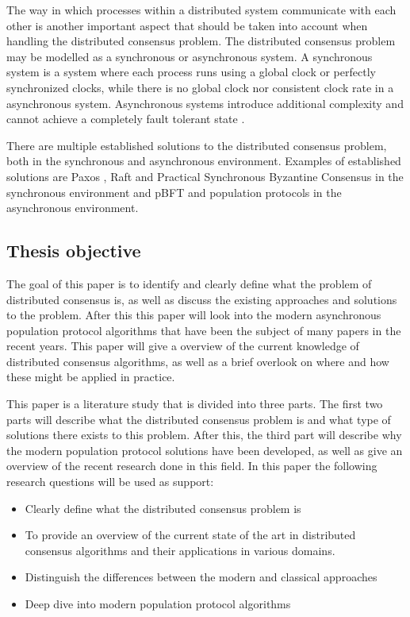 The way in which processes within a distributed system communicate with each other is another important aspect that should be taken into account when handling the distributed consensus problem. The distributed consensus problem may be modelled as a synchronous or asynchronous system. A synchronous system is a system where each process runs using a global clock or perfectly synchronized clocks, while there is no global clock nor consistent clock rate in a asynchronous system. Asynchronous systems introduce additional complexity and cannot achieve a completely fault tolerant state \cite{fischerImpossibilityDistributedConsensus}.

There are multiple established solutions to the distributed consensus problem, both in the synchronous and asynchronous environment. Examples of established solutions are Paxos \cite{lamportFastPaxos2006}, Raft \cite{ongaroSearchUnderstandableConsensus} and Practical Synchronous Byzantine Consensus \cite{renPracticalSynchronousByzantine} in the synchronous environment and pBFT \cite{castroPracticalByzantineFault} and population protocols \cite{aspnesIntroductionPopulationProtocols2009} in the asynchronous environment.

\clearpage

\subsection{Thesis objective}
The goal of this paper is to identify and clearly define what the problem of distributed consensus is,
as well as discuss the existing approaches and solutions to the problem. After this this paper will look into the modern asynchronous population protocol algorithms that have been the subject of many papers in the recent years. 
This paper will give a overview of the current knowledge of distributed consensus algorithms, as well as a brief overlook on where and how these might be applied in practice.

This paper is a literature study that is divided into three parts. The first two parts will describe what the distributed consensus problem is and what type of solutions there exists to this problem. After this, the third part will describe why the modern population protocol solutions have been developed, as well as give an overview of the recent research done in this field. In this paper the following research questions will be used as support:

\begin{itemize}
    \item Clearly define what the distributed consensus problem is
    \item To provide an overview of the current state of the art in distributed consensus algorithms and their applications in various domains.
    \item Distinguish the differences between the modern and classical approaches
    \item Deep dive into modern population protocol algorithms
\end{itemize}

